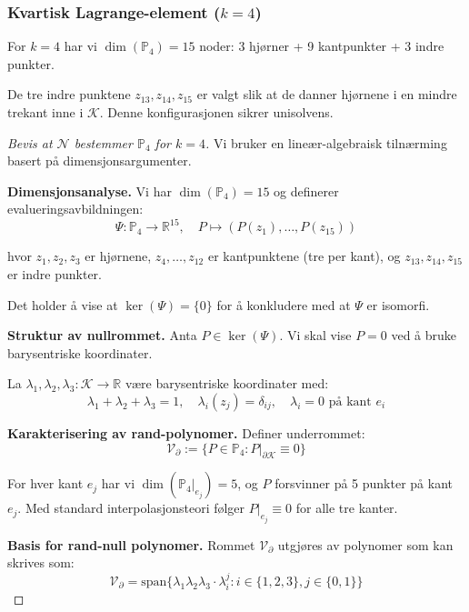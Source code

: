 \documentclass[../../main.tex]{subfiles}
\begin{document}
\subsubsection{Kvartisk Lagrange-element ($k=4$)}

For $k=4$ har vi $\dim(\mathbb{P}_4) = 15$ noder: 3 hjørner + 9 kantpunkter + 3 indre punkter.

\begin{center}
    
\end{center}

De tre indre punktene $z_{13}, z_{14}, z_{15}$ er valgt slik at de danner hjørnene i en mindre trekant inne i $\mathcal{K}$. Denne konfigurasjonen sikrer unisolvens.

\begin{proof}[Bevis at $\mathcal{N}$ bestemmer $\mathbb{P}_4$ for $k=4$]
Vi bruker en lineær-algebraisk tilnærming basert på dimensjonsargumenter.

\textbf{Dimensjonsanalyse.} Vi har $\dim(\mathbb{P}_4) = 15$ og definerer evalueringsavbildningen:
\[
    \Psi: \mathbb{P}_4 \to \mathbb{R}^{15}, \quad P \mapsto (P(z_1), \ldots, P(z_{15}))
\]

hvor $z_1, z_2, z_3$ er hjørnene, $z_4, \ldots, z_{12}$ er kantpunktene (tre per kant), og $z_{13}, z_{14}, z_{15}$ er indre punkter.

Det holder å vise at $\ker(\Psi) = \{0\}$ for å konkludere med at $\Psi$ er isomorfi.

\textbf{Struktur av nullrommet.} Anta $P \in \ker(\Psi)$. Vi skal vise $P = 0$ ved å bruke barysentriske koordinater.

La $\lambda_1, \lambda_2, \lambda_3: \mathcal{K} \to \mathbb{R}$ være barysentriske koordinater med:
\[
    \lambda_1 + \lambda_2 + \lambda_3 = 1, \quad \lambda_i(z_j) = \delta_{ij}, \quad \lambda_i = 0 \text{ på kant } e_i
\]

\textbf{Karakterisering av rand-polynomer.} Definer underrommet:
\[
    \mathcal{V}_{\partial} := \{P \in \mathbb{P}_4 : P|_{\partial \mathcal{K}} \equiv 0\}
\]

For hver kant $e_j$ har vi $\dim(\mathbb{P}_4|_{e_j}) = 5$, og $P$ forsvinner på 5 punkter på kant $e_j$. Med standard interpolasjonsteori følger $P|_{e_j} \equiv 0$ for alle tre kanter.

\textbf{Basis for rand-null polynomer.} Rommet $\mathcal{V}_{\partial}$ utgjøres av polynomer som kan skrives som:
\[
    \mathcal{V}_{\partial} = \text{span}\{\lambda_1 \lambda_2 \lambda_3 \cdot \lambda_i^j : i \in \{1,2,3\}, j \in \{0,1\}\}
\]


\end{proof}
\end{document}
